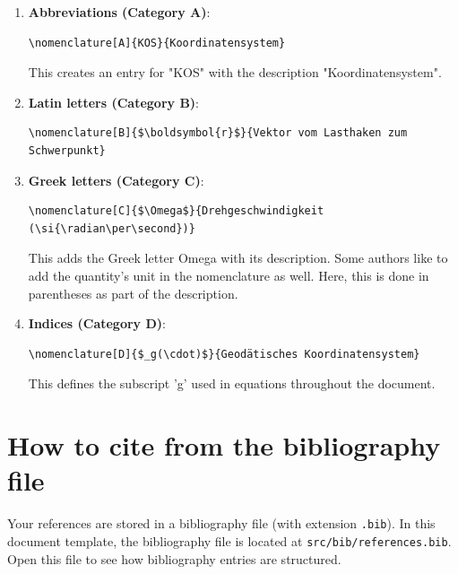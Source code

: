 \begin{enumerate}
    \item \textbf{Abbreviations (Category A)}:
    \begin{verbatim}
\nomenclature[A]{KOS}{Koordinatensystem}
    \end{verbatim}
    This creates an entry for "KOS" with the description "Koordinatensystem".
    
    \item \textbf{Latin letters (Category B)}:
    \begin{verbatim}
\nomenclature[B]{$\boldsymbol{r}$}{Vektor vom Lasthaken zum Schwerpunkt}
    \end{verbatim}
    
    \item \textbf{Greek letters (Category C)}:
    \begin{verbatim}
\nomenclature[C]{$\Omega$}{Drehgeschwindigkeit (\si{\radian\per\second})}
    \end{verbatim}
    This adds the Greek letter Omega with its description.
    Some authors like to add the quantity's unit in the nomenclature as well.
    Here, this is done in parentheses as part of the description. 
    
    \item \textbf{Indices (Category D)}:
    \begin{verbatim}
\nomenclature[D]{$_g(\cdot)$}{Geodätisches Koordinatensystem}
    \end{verbatim}
    This defines the subscript 'g' used in equations throughout the document.
\end{enumerate}

\section{How to cite from the bibliography file}

Your references are stored in a bibliography file (with extension \texttt{.bib}). In this document template, the bibliography file is located at \texttt{src/bib/references.bib}. Open this file to see how bibliography entries are structured.

